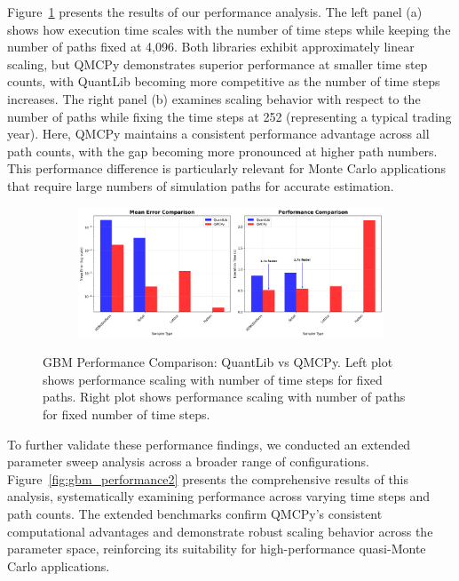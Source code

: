 Figure~\ref{fig:gbm_performance} presents the results of our performance
analysis. The left panel (a) shows how execution time scales with the number of
time steps while keeping the number of paths fixed at 4,096. Both libraries
exhibit approximately linear scaling, but QMCPy demonstrates superior
performance at smaller time step counts, with QuantLib becoming more competitive
as the number of time steps increases. The right panel (b) examines scaling
behavior with respect to the number of paths while fixing the time steps at 252
(representing a typical trading year). Here, QMCPy maintains a consistent
performance advantage across all path counts, with the gap becoming more
pronounced at higher path numbers. This performance difference is particularly
relevant for Monte Carlo applications that require large numbers of simulation
paths for accurate estimation.

\begin{figure}[H]
    \centering
    \begin{subfigure}{1\textwidth}
        \centering
        \includegraphics[width=\textwidth]{GBM/images/figure_6.png}
    \end{subfigure}
    \caption{GBM Performance Comparison: QuantLib vs QMCPy. Left plot shows performance scaling with number of time steps for fixed paths. Right plot shows performance scaling with number of paths for fixed number of time steps.}
    \label{fig:gbm_performance}
\end{figure}

To further validate these performance findings, we conducted an extended
parameter sweep analysis across a broader range of configurations.
Figure~\ref{fig:gbm_performance2} presents the comprehensive results of this
analysis, systematically examining performance across varying time steps and
path counts. The extended benchmarks confirm QMCPy's consistent computational
advantages and demonstrate robust scaling behavior across the parameter space,
reinforcing its suitability for high-performance quasi-Monte Carlo applications.

